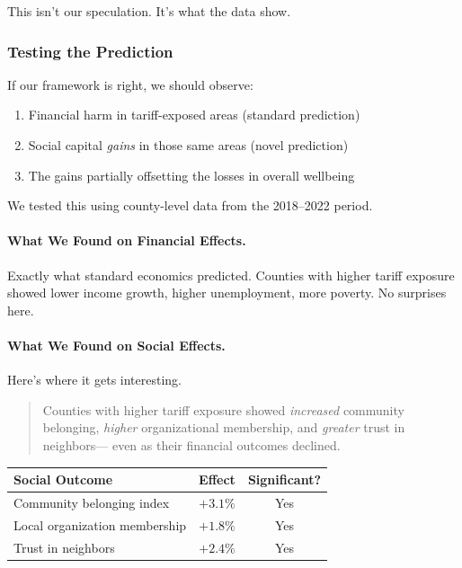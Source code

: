 This isn't our speculation. It's what the data show.

\subsubsection{Testing the Prediction}

If our framework is right, we should observe:
\begin{enumerate}
    \item Financial harm in tariff-exposed areas (standard prediction)
    \item Social capital \emph{gains} in those same areas (novel prediction)
    \item The gains partially offsetting the losses in overall wellbeing
\end{enumerate}

We tested this using county-level data from the 2018--2022 period.

\paragraph{What We Found on Financial Effects.}
Exactly what standard economics predicted. Counties with higher tariff exposure 
showed lower income growth, higher unemployment, more poverty. No surprises here.

\paragraph{What We Found on Social Effects.}
Here's where it gets interesting.

\begin{quote}
Counties with higher tariff exposure showed \emph{increased} community belonging, 
\emph{higher} organizational membership, and \emph{greater} trust in neighbors---
even as their financial outcomes declined.
\end{quote}

\begin{center}
\renewcommand{\arraystretch}{1.2}
\begin{tabular}{lcc}
\hline
\textbf{Social Outcome} & \textbf{Effect} & \textbf{Significant?} \\
\hline
Community belonging index & $+3.1\%$ & Yes \\
Local organization membership & $+1.8\%$ & Yes \\
Trust in neighbors & $+2.4\%$ & Yes \\
\hline
\end{tabular}
\end{center}

